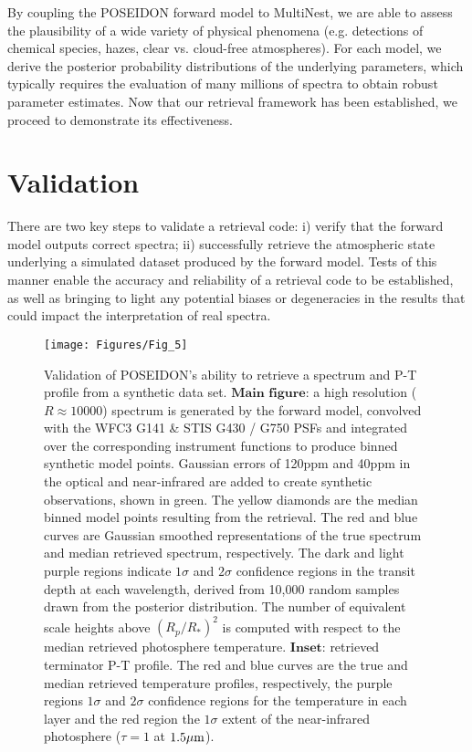 \documentclass[fleqn,usenatbib]{mnras}
\begin{document}
By coupling the POSEIDON forward model to MultiNest, we are able to assess the plausibility of a wide variety of physical phenomena (e.g. detections of chemical species, hazes, clear vs. cloud-free atmospheres). For each model, we derive the posterior probability distributions of the underlying parameters, which typically requires the evaluation of many millions of spectra to obtain robust parameter estimates. Now that our retrieval framework has been established, we proceed to demonstrate its effectiveness.

\section{Validation}\label{section:validation}

 There are two key steps to validate a retrieval code: i) verify that the forward model outputs correct spectra; ii) successfully retrieve the atmospheric state underlying a simulated dataset produced by the forward model. Tests of this manner enable the accuracy and reliability of a retrieval code to be established, as well as bringing to light any potential biases or degeneracies in the results that could impact the interpretation of real spectra.

\begin{figure*}
	\texttt{[image: Figures/Fig\_5]}
    \caption{Validation of POSEIDON's ability to retrieve a spectrum and P-T profile from a synthetic data set. $\textbf{Main figure:}$ a high resolution ($R \approx 10000$) spectrum is generated by the forward model, convolved with the WFC3 G141 \& STIS G430 / G750 PSFs and integrated over the corresponding instrument functions to produce binned synthetic model points. Gaussian errors of 120ppm and 40ppm in the optical and near-infrared are added to create synthetic observations, shown in green. The yellow diamonds are the median binned model points resulting from the retrieval. The red and blue curves are Gaussian smoothed representations of the true spectrum and median retrieved spectrum, respectively. The dark and light purple regions indicate $1\sigma$ and $2\sigma$ confidence regions in the transit depth at each wavelength, derived from 10,000 random samples drawn from the posterior distribution. The number of equivalent scale heights above $(R_{p}/R_{*})^2$ is computed with respect to the median retrieved photosphere temperature. $\textbf{Inset:}$ retrieved terminator P-T profile. The red and blue curves are the true and median retrieved temperature profiles, respectively, the purple regions $1\sigma$ and $2\sigma$ confidence regions for the temperature in each layer and the red region the $1\sigma$ extent of the near-infrared photosphere ($\tau = 1$ at $1.5 \hbox{$\mu$m}$).}
    \label{fig:sim_retrieved_spectrum}
\end{figure*}
\end{document}
